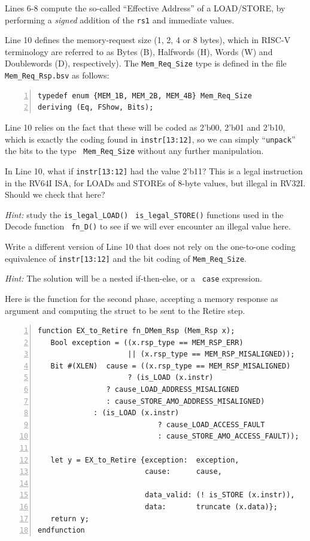 Lines 6-8 compute the so-called ``Effective Address'' of a LOAD/STORE,
by performing a \emph{signed} addition of the {\tt rs1} and immediate
values.

Line 10 defines the memory-request size (1, 2, 4 or 8 bytes), which in
RISC-V terminology are referred to as Bytes (B), Halfwords (H), Words
(W) and Doublewords (D), respectively).  The {\tt Mem\_Req\_Size} type
is defined in the file {\tt Mem\_Req\_Rsp.bsv} as follows:

{\small
\begin{Verbatim}[frame=single, numbers=left]
typedef enum {MEM_1B, MEM_2B, MEM_4B} Mem_Req_Size
deriving (Eq, FShow, Bits);
\end{Verbatim}
}

Line 10 relies on the fact that these will be coded as 2'b00, 2'b01
and 2'b10, which is exactly the coding found in {\tt instr[13:12]}, so
we can simply ``{\tt unpack}'' the bits to the type {\tt
Mem\_Req\_Size} without any further manipulation.

\hdivider

\Exercise

In Line 10, what if {\tt instr[13:12]} had the value 2'b11?  This is a
legal instruction in the RV64I ISA, for LOADs and STOREs of 8-byte
values, but illegal in RV32I.  Should we check that here?

\emph{Hint:} study the {\tt is\_legal\_LOAD()} {\tt
is\_legal\_STORE()} functions used in the Decode function {\tt
fn\_D()} to see if we will ever encounter an illegal value here.

\Exercise

Write a different version of Line 10 that does not rely on the
one-to-one coding equivalence of {\tt instr[13:12]} and the bit coding
of {\tt Mem\_Req\_Size}.

\emph{Hint:} The solution will be a nested if-then-else, or a {\tt
case} expression.

\Endexercise

Here is the function for the second phase, accepting a memory response
as argument and computing the struct to be sent to the Retire step.

{\small
\begin{Verbatim}[frame=single, numbers=left]
function EX_to_Retire fn_DMem_Rsp (Mem_Rsp x);
   Bool exception = ((x.rsp_type == MEM_RSP_ERR)
                     || (x.rsp_type == MEM_RSP_MISALIGNED));
   Bit #(XLEN)  cause = ((x.rsp_type == MEM_RSP_MISALIGNED)
       		      	 ? (is_LOAD (x.instr)
			    ? cause_LOAD_ADDRESS_MISALIGNED
			    : cause_STORE_AMO_ADDRESS_MISALIGNED)
			 : (is_LOAD (x.instr)
                            ? cause_LOAD_ACCESS_FAULT
                            : cause_STORE_AMO_ACCESS_FAULT));

   let y = EX_to_Retire {exception:  exception,
                         cause:      cause,

                         data_valid: (! is_STORE (x.instr)),
                         data:       truncate (x.data)};
   return y;
endfunction
\end{Verbatim}
}

